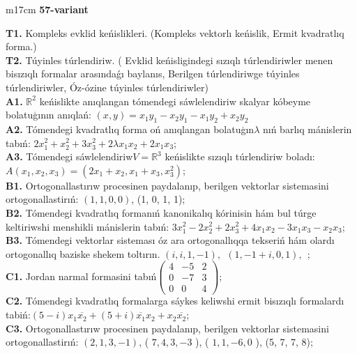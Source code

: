 \documentclass{article}
\begin{document}
\begin{tabular}{m{17cm}}
\textbf{57-variant}
\newline

\textbf{T1.} Kompleks evklid keńislikleri.  (Kompleks vektorlı keńislik, Ermit kvadratlıq forma.) \\
\textbf{T2.} Túyinles túrlendiriw. ( Evklid keńisligindegi sızıqlı túrlendiriwler menen bisızıqlı formalar arasındaǵı baylanıs, Berilgen túrlendiriwge túyinles túrlendiriwler, Óz-ózine túyinles túrlendiriwler) \\
\textbf{A1.} \(\mathbb{R}^{2}\) keńislikte anıqlangan tómendegi sáwlelendiriw skalyar kóbeyme bolatuģının anıqlań: \((x,y) = x_{1}y_{1} - x_{2}y_{1} - x_{1}y_{2} + x_{2}y_{2}\) \\
\textbf{A2.} Tómendegi kvadratlıq forma oń anıqlangan bolatuģın\(\lambda\) nıń barlıq mánislerin tabıń: \(2x_{1}^{2} + x_{2}^{2} + 3x_{3}^{2} + 2\lambda x_{1}x_{2} + 2x_{1}x_{3}\); \\
\textbf{A3.} Tómendegi sáwlelendiriw\(V = \mathbb{R}^{3}\) keńislikte sızıqlı túrlendiriw boladı: \(A\left( x_{1},x_{2},x_{3} \right) = \left( 2x_{1} + x_{2},x_{1} + x_{3},x_{3}^{2} \right)\); \\
\textbf{B1.} Ortogonallastırıw procesinen paydalanıp, berilgen vektorlar sistemasini ortogonallastirıń: \((1,1,0,0)\), (1, 0, 1, 1); \\
\textbf{B2.} Tómendegi kvadratlıq formanıń kanonikalıq kórinisin hám bul túrge keltiriwshi menshikli mánislerin tabıń: \(3x_{1}^{2} - 2x_{2}^{2} + 2x_{3}^{2} + 4x_{1}x_{2} - 3x_{1}x_{3} - x_{2}x_{3}\); \\
\textbf{B3.} Tómendegi vektorlar sisteması óz ara ortogonallıqqa tekseriń hám olardı ortogonallıq baziske shekem toltırın. \((i,i,1, - 1),\ \ (1, - 1 + i,0,1),\ \ \); \\
\textbf{C1.} Jordan narmal formasini tabıń\(\begin{pmatrix} 4 & - 5 & 2 \\ 0 & - 7 & 3 \\ 0 & 0 & 4 \end{pmatrix}\); \\
\textbf{C2.} Tómendegi kvadratlıq formalarga sáykes keliwshi ermit bisızıqlı formalardı tabiń:\((5 - i)x_{1}\overline{x_{2}} + (5 + i)\overline{x_{1}}x_{2} + x_{2}\overline{x_{2}}\); \\
\textbf{C3.} Ortogonallastırıw procesinen paydalanıp, berilgen vektorlar sistemasini ortogonallastirıń: \((2,1,3, - 1)\), ( \(7,4,3, - 3\) ), ( \(1,1, - 6,0\) ), (5, 7, 7, 8); \\

\end{tabular}
\vspace{1cm}
\end{document}
